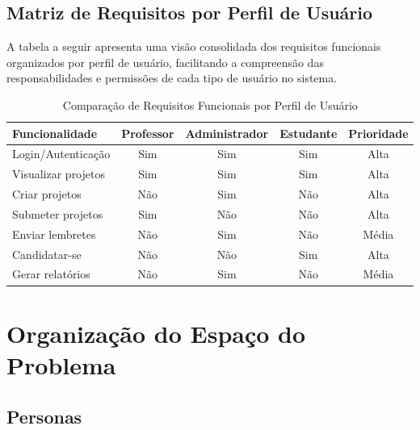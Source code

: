 \documentclass[12pt, a4paper]{report}
\begin{document}
\subsection{Matriz de Requisitos por Perfil de Usuário}

A tabela a seguir apresenta uma visão consolidada dos requisitos funcionais organizados por perfil de usuário, facilitando a compreensão das responsabilidades e permissões de cada tipo de usuário no sistema.

\begin{table}[H]
\centering
\caption{Comparação de Requisitos Funcionais por Perfil de Usuário}
\label{tab:requisitos-perfil}
\renewcommand{\arraystretch}{1.2}
\begin{tabular}{|p{4cm}|c|c|c|c|}
\hline
\textbf{Funcionalidade} & \textbf{Professor} & \textbf{Administrador} & \textbf{Estudante} & \textbf{Prioridade} \\
\hline
Login/Autenticação & \cellcolor{green!30}Sim & \cellcolor{green!30}Sim & \cellcolor{green!30}Sim & Alta \\
\hline
Visualizar projetos & \cellcolor{green!30}Sim & \cellcolor{green!30}Sim & \cellcolor{green!30}Sim & Alta \\
\hline
Criar projetos & \cellcolor{red!30}Não & \cellcolor{green!30}Sim & \cellcolor{red!30}Não & Alta \\
\hline
Submeter projetos & \cellcolor{green!30}Sim & \cellcolor{red!30}Não & \cellcolor{red!30}Não & Alta \\
\hline
Enviar lembretes & \cellcolor{red!30}Não & \cellcolor{green!30}Sim & \cellcolor{red!30}Não & Média \\
\hline
Candidatar-se & \cellcolor{red!30}Não & \cellcolor{red!30}Não & \cellcolor{green!30}Sim & Alta \\
\hline
Gerar relatórios & \cellcolor{red!30}Não & \cellcolor{green!30}Sim & \cellcolor{red!30}Não & Média \\
\hline
\end{tabular}
\end{table}

\section{Organização do Espaço do Problema}

\subsection{Personas}
\end{document}
